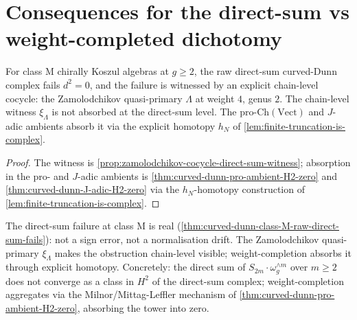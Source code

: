 \section{Consequences for the direct-sum vs weight-completed
dichotomy}
\label{sec:consequences-dichotomy}

\begin{corollary}
\label{cor:class-m-direct-sum-is-wrong-ambient-strong}
\ClaimStatusProvedHere
For class \(\mathrm{M}\) chirally Koszul algebras at \(g \ge 2\),
the raw direct-sum curved-Dunn complex fails \(d^{2} = 0\), and
the failure is witnessed by an explicit chain-level cocycle: the
Zamolodchikov quasi-primary \(\Lambda\) at weight \(4\), genus
\(2\). The chain-level witness \(\xi_{\Lambda}\) is not absorbed
at the direct-sum level. The
pro-\(\mathrm{Ch}(\mathrm{Vect})\) and \(J\)-adic ambients
absorb it via the explicit homotopy \(h_{N}\) of
\autoref{lem:finite-truncation-is-complex}.
\end{corollary}

\begin{proof}
The witness is
\autoref{prop:zamolodchikov-cocycle-direct-sum-witness};
absorption in the pro- and \(J\)-adic ambients is
\autoref{thm:curved-dunn-pro-ambient-H2-zero} and
\autoref{thm:curved-dunn-J-adic-H2-zero} via the
\(h_{N}\)-homotopy construction of
\autoref{lem:finite-truncation-is-complex}.
\end{proof}

\begin{remark}[Summary]
\label{rem:first-principles-summary-direct-sum}
The direct-sum failure at class \(\mathrm{M}\) is real
(\autoref{thm:curved-dunn-class-M-raw-direct-sum-fails}): not a
sign error, not a normalisation drift. The Zamolodchikov
quasi-primary \(\xi_{\Lambda}\) makes the obstruction
chain-level visible; weight-completion absorbs it through
explicit homotopy. Concretely: the direct sum of
\(S_{2m} \cdot \omega_{g}^{\wedge m}\) over \(m \ge 2\) does not
converge as a class in \(H^{2}\) of the direct-sum complex;
weight-completion aggregates via the Milnor/Mittag-Leffler
mechanism of \autoref{thm:curved-dunn-pro-ambient-H2-zero},
absorbing the tower into zero.
\end{remark}
